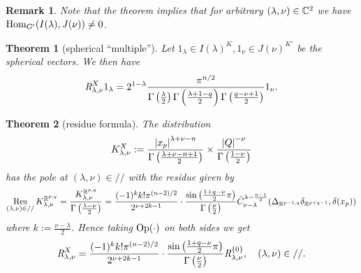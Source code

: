 \documentclass[10pt]{article} %
\newtheorem{theorem}{Theorem}
\newcommand{\Hom}{\mbox{\normalfont Hom}}
\newtheorem{remark}{Remark}
\theoremstyle{definition}
\newcommand{\Op}{\mbox{\normalfont Op}}
\newcommand{\Res}{\operatorname{Res}\displaylimits}
\newcommand{\OpR}{\mbox{\it R}}
\begin{document}
\begin{remark}
	Note that the theorem implies that for arbitrary $(\lambda,\nu)\in\mathbb{C}^2$ we have $\Hom_{G'}(I(\lambda),J(\nu))\neq0$.
\end{remark}
\begin{theorem}[spherical ``multiple'']
	Let $1_\lambda\in I(\lambda)^K,1_\nu\in J(\nu)^{K'}$ be the spherical vectors. We then have
\[ \OpR^X_{\lambda, \nu} 1_{\lambda} = 2^{1 -
\lambda} \frac{\pi^{n / 2}}{\Gamma \left( \frac{\lambda}{2} \right)
\Gamma \left(  \frac{\lambda + 1-q}{2} \right) \Gamma \left(
\frac{q - \nu + 1}{2} \right)} 1_{\nu}. \]
\end{theorem}
\begin{theorem}[residue formula]
		The distribution
		\[K_{\lambda,\nu}^X:=\frac{\left|x_p\right|^{\lambda+\nu-n}}{\Gamma\left( \frac{\lambda+\nu-n+1}{2} \right)}\times
		\frac{\left|Q\right|^{-\nu}}{\Gamma\left( \frac{1-\nu}{2} \right)}\]
		has the pole at $(\lambda,\nu)\in//$ with the residue given by
		\[\Res_{(\lambda,\nu)\in//}K_{\lambda,\nu}^{\mathbb{R}^{p,q}}=\frac{K_{\lambda,\nu}^{\mathbb{R}^{p,q}}}{\Gamma\left( \frac{\lambda-\nu}{2} \right)}
			=\frac{ (- 1)^k k!\pi^{(n - 2) / 2} 
		}{2^{ \nu + 2 k-1}}\cdot  \frac{\sin\left( \frac{1+q-\nu}{2}\pi \right)}{\Gamma\left( \frac{\nu}{2} \right)}
	\tilde{C}_{\nu - \lambda}^{\lambda - \frac{n
  	- 1}{2}} ({\Delta}_{\mathbb{R}^{p-1,q}} {\delta}_{\mathbb{R}^{p+q-1}}, \delta (x_p))
		\]
		where $k:=\frac{\nu-\lambda}{2}$.
		Hence taking $\Op(\cdot)$ on both sides we get
  \[\OpR_{\lambda,\nu}^X  = \frac{ (- 1)^k k!\pi^{(n - 2) / 2} 
		}{2^{ \nu + 2 k-1}}\cdot  \frac{\sin\left( \frac{1+q-\nu}{2}\pi \right)}{\Gamma\left( \frac{\nu}{2} \right)}
     \OpR_{\lambda,\nu}^{ \left\{ 0 \right\} },\quad(\lambda,\nu)\in// . \]
	\end{theorem}
\end{document}
